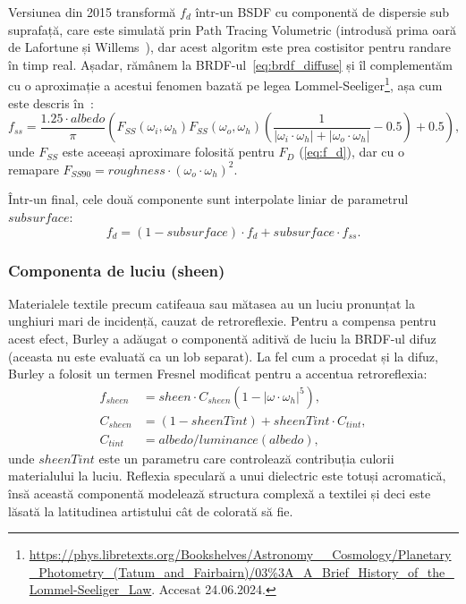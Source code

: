 \documentclass[12pt,a4paper]{report}
\numberwithin{equation}{section} %
\begin{document}
Versiunea din 2015 transformă $f_d$ într-un BSDF cu componentă de dispersie
sub suprafață, care este simulată prin Path Tracing Volumetric (introdusă prima oară de Lafortune și Willems~\cite{Volumetric}),
dar acest algoritm este prea costisitor pentru randare în timp real.
Așadar, rămânem la BRDF-ul~\ref{eq:brdf_diffuse} și îl complementăm cu o aproximație
a acestui fenomen bazată pe legea Lommel-Seeliger\footnote{\url{https://phys.libretexts.org/Bookshelves/Astronomy__Cosmology/Planetary_Photometry_(Tatum_and_Fairbairn)/03\%3A_A_Brief_History_of_the_Lommel-Seeliger_Law}. Accesat 24.06.2024.}, așa cum este descris în~\cite{DisneyHomework}:
\begin{equation}
	f_{ss} = \dfrac{1.25\cdot albedo}{\pi} \left(F_{SS}(\omega_i, \omega_h)F_{SS}(\omega_o, \omega_h) \left(\dfrac{1}{|\omega_i \cdot \omega_h| + |\omega_o \cdot \omega_h|} - 0.5\right) + 0.5 \right),
\end{equation}
unde $F_{SS}$ este aceeași aproximare folosită pentru $F_D$ (\ref{eq:f_d}), dar cu o remapare $F_{SS90} = roughness\cdot (\omega_o\cdot \omega_h)^2$.

Într-un final, cele două componente sunt interpolate liniar de parametrul $subsurface$:
\begin{equation}\label{eq:disney_diffuse}
	f_{d} = (1 - subsurface)\cdot f_d + subsurface\cdot f_{ss}.
\end{equation}

\subsubsection*{Componenta de luciu (sheen)}

Materialele textile precum catifeaua sau mătasea au un luciu pronunțat la unghiuri
mari de incidență, cauzat de retroreflexie. Pentru a compensa pentru acest efect,
Burley a adăugat o componentă aditivă de luciu la BRDF-ul difuz (aceasta nu este
evaluată ca un lob separat). La fel cum a procedat și la difuz, Burley a folosit
un termen Fresnel modificat pentru a accentua retroreflexia:
\begin{equation}
	\begin{aligned}\label{eq:disney_sheen}
		f_{sheen} & = sheen\cdot C_{sheen}(1 - |\omega\cdot\omega_h|^5), \\
		C_{sheen} & = (1 - sheenTint) + sheenTint\cdot C_{tint},         \\
		C_{tint}  & = albedo/luminance(albedo),
	\end{aligned}
\end{equation}
unde $sheenTint$ este un parametru care controlează contribuția culorii materialului
la luciu. Reflexia speculară a unui dielectric este totuși acromatică, însă această
componentă modelează structura complexă a textilei și deci este lăsată la latitudinea
artistului cât de colorată să fie.
\end{document}
